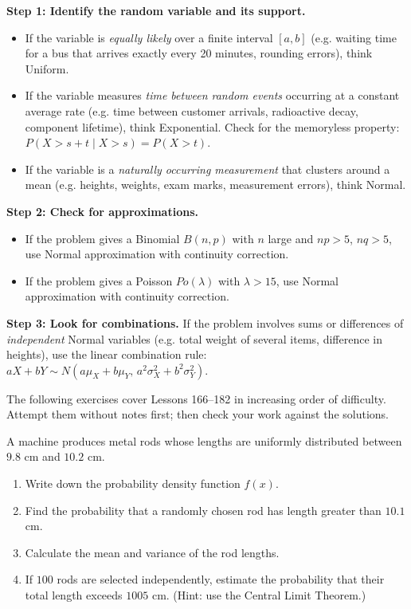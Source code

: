 \documentclass[11pt]{article}
\newcommand{\cle}[1]{{\popxbold\color{popdark}#1}}
\newcounter{popsec}
\newcounter{popsub}
\newcommand{\courssub}[1]{%
  \stepcounter{popsub}%
  \par\vspace{9pt}\noindent{\popxbold\fontsize{11.5}{13}\selectfont\color{popink}{\color{poporange}\thepopsec.\thepopsub}\hspace{6pt}#1}\par\nopagebreak\vspace{4pt}
}
\begin{document}
\begin{methode}
\textbf{Step 1: Identify the random variable and its support.}
\begin{itemize}
\item If the variable is \emph{equally likely} over a finite interval $[a,b]$ (e.g. waiting time for a bus that arrives exactly every 20 minutes, rounding errors), think \cle{Uniform}.
\item If the variable measures \emph{time between random events} occurring at a constant average rate (e.g. time between customer arrivals, radioactive decay, component lifetime), think \cle{Exponential}. Check for the memoryless property: $P(X>s+t\mid X>s)=P(X>t)$.
\item If the variable is a \emph{naturally occurring measurement} that clusters around a mean (e.g. heights, weights, exam marks, measurement errors), think \cle{Normal}.
\end{itemize}
\textbf{Step 2: Check for approximations.}
\begin{itemize}
\item If the problem gives a Binomial $B(n,p)$ with $n$ large and $np>5$, $nq>5$, use \cle{Normal approximation} with continuity correction.
\item If the problem gives a Poisson $Po(\lambda)$ with $\lambda>15$, use \cle{Normal approximation} with continuity correction.
\end{itemize}
\textbf{Step 3: Look for combinations.}
If the problem involves sums or differences of \emph{independent} Normal variables (e.g. total weight of several items, difference in heights), use the linear combination rule: $aX+bY\sim N(a\mu_X+b\mu_Y,\,a^2\sigma_X^2+b^2\sigma_Y^2)$.
\end{methode}

\courssub{Mixed Revision Exercises}

The following exercises cover Lessons 166–182 in increasing order of difficulty. Attempt them without notes first; then check your work against the solutions.

\begin{exercice}
A machine produces metal rods whose lengths are uniformly distributed between $9.8$ cm and $10.2$ cm.
\begin{enumerate}
\item Write down the probability density function $f(x)$.
\item Find the probability that a randomly chosen rod has length greater than $10.1$ cm.
\item Calculate the mean and variance of the rod lengths.
\item If $100$ rods are selected independently, estimate the probability that their total length exceeds $1005$ cm. (Hint: use the Central Limit Theorem.)
\end{enumerate}
\end{exercice}
\end{document}
